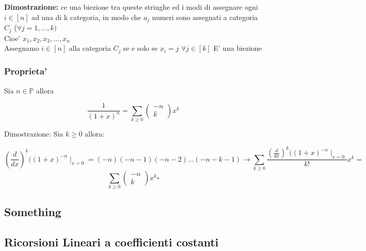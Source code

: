 \documentclass{article}
\begin{document}
        \begin{flushleft}
          \textbf{Dimostrazione:} ce una biezione tra queste stringhe ed i modi di assegnare ogni $i \in [n]$ ad una di k categoria,
          in modo che $a_j$ numeri sono assegnati a categoria $C_j$ ($\forall j =1,...,k)$ \\ 
          Cioe' $x_1,x_2,x_3,...,x_n$ \\ 
          Assegnamo $i \in [n]$ alla categoria $C_j$ se e solo se $x_i=j$ $\forall j \in [k]$ E' una biezione
        \end{flushleft}
        \subsubsection{Proprieta'}
        \begin{flushleft}
          Sia $n \in \mathbb{P}$ allora 
        \end{flushleft}
        \begin{equation}
          \frac{1}{(1+x)^n}=\sum_{k \geq 0} \begin{pmatrix}
            -n \\ 
            k
          \end{pmatrix}x^k
        \end{equation}
        \begin{flushleft}
          Dimostrazione: Sia $k \geq 0$ allora:
        \end{flushleft}
        \begin{equation}
          (\frac{d}{dx})^k ((1+x)^{-n} \mid_{x=0} = (-n)(-n-1)(-n-2)...(-n-k-1) \to \sum_{k \geq 0} \frac{(\frac{d}{dx})^k((1+x)^{-n}\mid_{x=0}}{k!}x^k=
        \end{equation}
        \begin{equation}
          \sum_{k \geq 0} \begin{pmatrix}
            -n \\ 
            k
          \end{pmatrix} x^k \square
        \end{equation}
        \subsection{Something}
        \subsection{Ricorsioni Lineari a coefficienti costanti}
\end{document}
